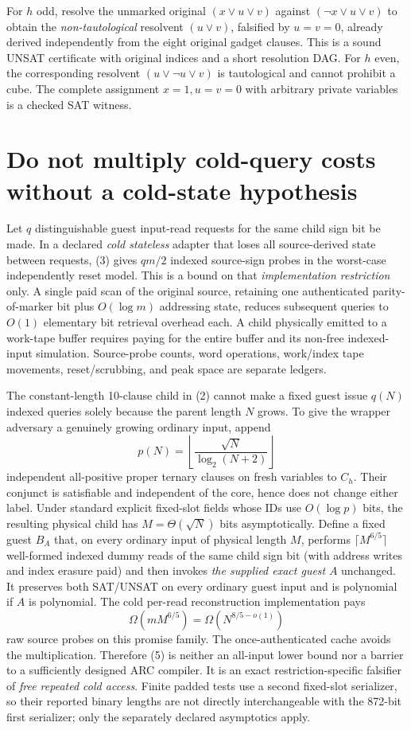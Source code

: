 \documentclass[11pt]{article}
\begin{document}
For $h$ odd, resolve the unmarked original $(x\vee u\vee v)$ against $(\neg x\vee u\vee v)$ to obtain the \emph{non-tautological} resolvent $(u\vee v)$, falsified by $u=v=0$, already derived independently from the eight original gadget clauses. This is a sound UNSAT certificate with original indices and a short resolution DAG. For $h$ even, the corresponding resolvent $(u\vee\neg u\vee v)$ is tautological and cannot prohibit a cube. The complete assignment $x=1,u=v=0$ with arbitrary private variables is a checked SAT witness.

\section{Do not multiply cold-query costs without a cold-state hypothesis}
Let $q$ distinguishable guest input-read requests for the same child sign bit be made. In a declared \emph{cold stateless} adapter that loses all source-derived state between requests, (3) gives $q m/2$ indexed source-sign probes in the worst-case independently reset model. This is a bound on that \emph{implementation restriction} only. A single paid scan of the original source, retaining one authenticated parity-of-marker bit plus $O(\log m)$ addressing state, reduces subsequent queries to $O(1)$ elementary bit retrieval overhead each. A child physically emitted to a work-tape buffer requires paying for the entire buffer and its non-free indexed-input simulation. Source-probe counts, word operations, work/index tape movements, reset/scrubbing, and peak space are separate ledgers.

The constant-length 10-clause child in (2) cannot make a fixed guest issue $q(N)$ indexed queries solely because the parent length $N$ grows. To give the wrapper adversary a genuinely growing ordinary input, append
\[
p(N)=\left\lfloor\frac{\sqrt N}{\log_2(N+2)}\right\rfloor
\tag{4}
\]
independent all-positive proper ternary clauses on fresh variables to $C_h$. Their conjunct is satisfiable and independent of the core, hence does not change either label. Under standard explicit fixed-slot fields whose IDs use $O(\log p)$ bits, the resulting physical child has
$M=\Theta(\sqrt N)$ bits asymptotically. Define a fixed guest $B_A$ that, on every ordinary input of physical length $M$, performs $\lceil M^{6/5}\rceil$ well-formed indexed dummy reads of the same child sign bit (with address writes and index erasure paid) and then invokes \emph{the supplied exact guest} $A$ unchanged. It preserves both SAT/UNSAT on every ordinary guest input and is polynomial if $A$ is polynomial. The cold per-read reconstruction implementation pays
\[
 \Omega\!\left(m M^{6/5}\right)
 =\Omega\!\left(N^{8/5-o(1)}\right)
\tag{5}
\]
raw source probes on this promise family. The once-authenticated cache avoids the multiplication. Therefore (5) is neither an all-input lower bound nor a barrier to a sufficiently designed ARC compiler. It is an exact restriction-specific falsifier of \emph{free repeated cold access}. Finite padded tests use a second fixed-slot serializer, so their reported binary lengths are not directly interchangeable with the 872-bit first serializer; only the separately declared asymptotics apply.
\end{document}
